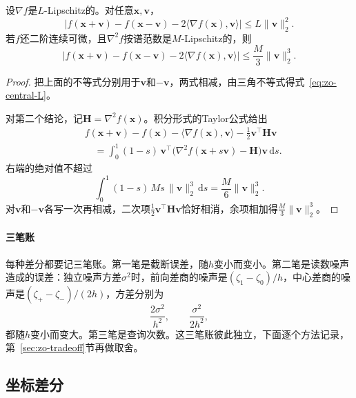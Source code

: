 \begin{lemma}[差商的余项]
\label{lem:zo-remainder}
设$\nabla f$是$L$-Lipschitz的。对任意$\bm{x},\bm{v}$，
\begin{equation}
 \bigl\lvert f(\bm{x}+\bm{v})-f(\bm{x}-\bm{v})-2\langle\nabla f(\bm{x}),\bm{v}\rangle\bigr\rvert
 \leq L\lVert\bm{v}\rVert_2^2.
 \label{eq:zo-central-L}
\end{equation}
若$f$还二阶连续可微，且$\nabla^2f$按谱范数是$M$-Lipschitz的，则
\begin{equation}
 \bigl\lvert f(\bm{x}+\bm{v})-f(\bm{x}-\bm{v})-2\langle\nabla f(\bm{x}),\bm{v}\rangle\bigr\rvert
 \leq\frac{M}{3}\lVert\bm{v}\rVert_2^3.
 \label{eq:zo-central-M}
\end{equation}
\end{lemma}

\begin{proof}
把上面的不等式分别用于$\bm{v}$和$-\bm{v}$，两式相减，由三角不等式得式~\eqref{eq:zo-central-L}。

对第二个结论，记$\bm{H}=\nabla^2f(\bm{x})$。积分形式的Taylor公式给出
\[
 \begin{aligned}
 &f(\bm{x}+\bm{v})-f(\bm{x})-\langle\nabla f(\bm{x}),\bm{v}\rangle-\frac12\bm{v}^\top\bm{H}\bm{v}\\
 &\quad=\int_0^1(1-s)\,\bm{v}^\top\bigl(\nabla^2f(\bm{x}+s\bm{v})-\bm{H}\bigr)\bm{v}\,\mathrm{d}s.
 \end{aligned}
\]
右端的绝对值不超过
\[
 \int_0^1(1-s)\,Ms\,\lVert\bm{v}\rVert_2^3\,\mathrm{d}s=\frac{M}{6}\lVert\bm{v}\rVert_2^3.
\]
对$\bm{v}$和$-\bm{v}$各写一次再相减，二次项$\tfrac12\bm{v}^\top\bm{H}\bm{v}$恰好相消，余项相加得$\tfrac{M}{3}\lVert\bm{v}\rVert_2^3$。
\end{proof}

\paragraph{三笔账}
每种差分都要记三笔账。第一笔是截断误差，随$h$变小而变小。第二笔是读数噪声造成的误差：独立噪声方差$\sigma^2$时，前向差商的噪声是$(\zeta_1-\zeta_0)/h$，中心差商的噪声是$(\zeta_+-\zeta_-)/(2h)$，方差分别为
\begin{equation}
 \frac{2\sigma^2}{h^2},\qquad\frac{\sigma^2}{2h^2},
 \label{eq:zo-quotient-noise}
\end{equation}
都随$h$变小而变大。第三笔是查询次数。这三笔账彼此独立，下面逐个方法记录，第~\ref{sec:zo-tradeoff}节再做取舍。

\subsection{坐标差分}
\label{sec:zo-coordinate}

